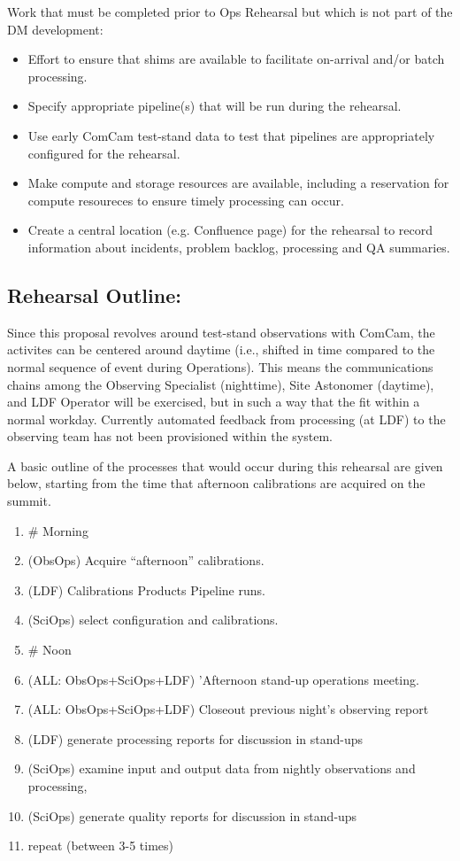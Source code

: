 Work that must be completed prior to Ops Rehearsal but which is not part of 
the DM development:
\begin{itemize}[topsep=-8pt]
\item Effort to ensure that shims are available to facilitate on-arrival and/or
batch processing.  
\item Specify appropriate pipeline(s) that will be run during the rehearsal.
\item Use early ComCam test-stand data to test that pipelines are appropriately 
configured for the rehearsal.
\item Make compute and storage resources are available, including a reservation for
compute resoureces to ensure timely processing can occur.
\item Create a central location (e.g. Confluence page) for the rehearsal to record 
information about incidents, problem backlog, processing and QA summaries.
\end{itemize}


\subsection{Rehearsal Outline:}
Since this proposal revolves around test-stand observations with ComCam, the 
activites can be centered around daytime (i.e., shifted in time compared to 
the normal sequence of event during Operations).  This means the communications chains 
among the Observing Specialist (nighttime), Site Astonomer (daytime), and LDF Operator
will be exercised, but in such a way that the fit within a normal workday.
Currently automated feedback from processing (at LDF) to the observing team has not been provisioned 
within the system.

A basic outline of the processes that would occur during this rehearsal are given below, 
starting from the time that afternoon calibrations are acquired on the summit.
\begin{enumerate}[topsep=-8pt]
\item \# Morning
\item (ObsOps) Acquire ``afternoon'' calibrations.
\item (LDF) Calibrations Products Pipeline runs.
\item (SciOps) select configuration and calibrations.
\item \# Noon
\item (ALL: ObsOps+SciOps+LDF) 'Afternoon stand-up operations meeting.  
\item (ALL: ObsOps+SciOps+LDF) Closeout previous night's observing report
\item (LDF) generate processing reports for discussion in stand-ups
\item (SciOps) examine input and output data from nightly observations and processing, 
\item (SciOps) generate quality reports for discussion in stand-ups
\item repeat (between 3-5 times)
\end{enumerate}

